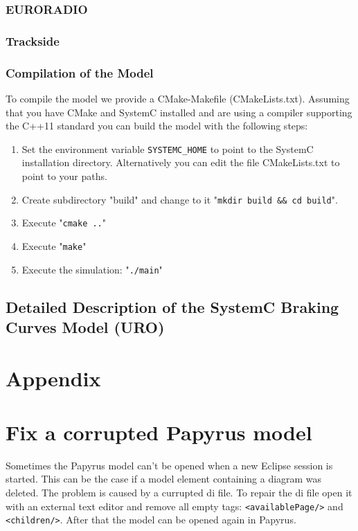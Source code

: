 \documentclass{template/openetcs_article}
\begin{document}
\subsubsection{EURORADIO}

\subsubsection{Trackside}



\subsubsection{Compilation of the Model}

To compile the model we provide a CMake-Makefile (CMakeLists.txt). Assuming that you have CMake and SystemC installed and are using a compiler supporting the C++11 standard you can build the model with the following steps:

\begin{enumerate}
  \item Set the environment variable \verb|SYSTEMC_HOME| to point to the SystemC installation directory. Alternatively you can edit the file CMakeLists.txt to point to your paths. 
  \item Create subdirectory "build" and change to it "\verb|mkdir build && cd build|". 
  \item Execute "\verb|cmake ..|" 
  \item Execute "\verb|make|" 
  \item Execute the simulation: "\verb|./main|" 
\end{enumerate}

\subsection{Detailed Description of the SystemC Braking Curves Model (URO)}


\section*{Appendix}
\section*{Fix a corrupted Papyrus model}
Sometimes the Papyrus model can't be opened when a new Eclipse session is started. This can be the case if a model element containing a diagram was deleted. The problem is caused by a currupted di file. To repair the di file open it with an external text editor and remove all empty tags:  \verb|<availablePage/>| and \verb|<children/>|. After that the model can be opened again in Papyrus.




\end{document}
